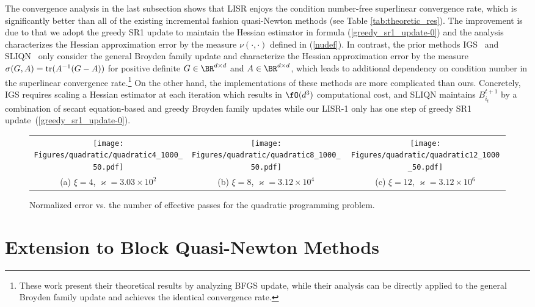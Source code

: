 The convergence analysis in the last subsection shows that LISR enjoys the condition number-free superlinear convergence rate, which is significantly better than all of the existing incremental fashion quasi-Newton methods (see Table \ref{tab:theoretic_res}).
The improvement is due to that we adopt the greedy SR1 update to maintain the Hessian estimator in formula (\ref{greedy_sr1_update-0}) and the analysis characterizes the Hessian approximation error by the measure $\nu(\cdot,\cdot)$ defined in (\ref{nudef}).
In contrast, the prior methods IGS~\cite{gao2020incremental} and SLIQN~\cite{lahoti2023sharpened} only consider the general Broyden family update and characterize the Hessian approximation error by the measure
$\sigma(G, A) = {\rm tr}(A^{-1}(G - A))$ for positive definite $G\in\BR^{d\times d}$ and $A\in\BR^{d\times d}$, which leads to additional dependency on condition number in the superlinear convergence rate.\footnote{These work present their theoretical results by analyzing BFGS update, while their analysis can be directly applied to the general Broyden family update and achieves the identical convergence rate.} 
On the other hand, the implementations of these methods are more complicated than ours. 
Concretely, IGS requires scaling a Hessian estimator at each iteration which results in $\fO(d^3)$ computational cost, and
SLIQN maintains $B_{i_t}^{t+1}$ by a combination of secant equation-based and greedy Broyden family updates while our LISR-1 only has one step of greedy SR1 update~(\ref{greedy_sr1_update-0}).

\begin{figure*}[!tb]
\centering
\begin{tabular}{ccc}
     \texttt{[image: Figures/quadratic/quadratic4\_1000\_50.pdf]}
     & \texttt{[image: Figures/quadratic/quadratic8\_1000\_50.pdf]}
     & \texttt{[image: Figures/quadratic/quadratic12\_1000\_50.pdf]} \\
     (a) $\xi = 4$, $\varkappa=3.03\times10^2$ & (b) $\xi = 8$, $\varkappa=3.12\times10^4$ & (c) $\xi = 12$, $\varkappa=3.12\times10^6$
\end{tabular}
\caption{Normalized error vs. the number of effective passes for the quadratic programming problem.}
\label{fig:quadratic_result}
\end{figure*}

\section{Extension to Block Quasi-Newton Methods}\label{sec:block_update}


